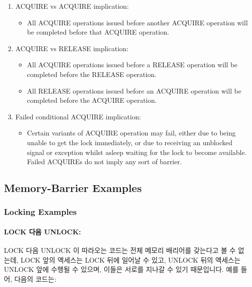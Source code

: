 \begin{enumerate}
\begin{enumerate}
\item	ACQUIRE vs ACQUIRE implication:
	\begin{itemize}
	\item	All ACQUIRE operations issued before another ACQUIRE operation
		will be completed before that ACQUIRE operation.
	\end{itemize}
\item	ACQUIRE vs RELEASE implication:
	\begin{itemize}
	\item	All ACQUIRE operations issued before a RELEASE operation
		will be completed before the RELEASE operation.
	\item	All RELEASE operations issued before an ACQUIRE operation
		will be completed before the ACQUIRE operation.
	\end{itemize}
\item	Failed conditional ACQUIRE implication:
	\begin{itemize}
	\item	Certain variants of ACQUIRE operation may fail, either
		due to being unable to get the lock immediately, or due
		to receiving an unblocked signal or exception
		whilst asleep waiting
		for the lock to become available.  Failed ACQUIREs do not
		imply any sort of barrier.
	\end{itemize}
\end{enumerate}
\fi

\subsection{Memory-Barrier Examples}
\label{sec:advsync:Memory-Barrier Examples}

\subsubsection{Locking Examples}

\paragraph{LOCK 다음 UNLOCK:}
LOCK 다음 UNLOCK 이 따라오는 코드는 전체 메모리 배리어를 갖는다고 볼 수 없는데,
LOCK 앞의 액세스는 LOCK 뒤에 일어날 수 있고, UNLOCK 뒤의 액세스는 UNLOCK 앞에
수행될 수 있으며, 이들은 서로를 지나갈 수 있기 때문입니다.
예를 들어, 다음의 코드는:

\end{enumerate}
